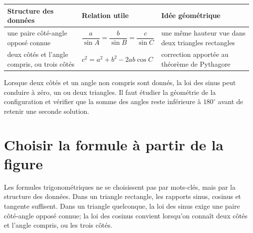 \documentclass[12pt,a4paper,openany]{book}
\begin{document}
\begin{center}
\begin{tabularx}{\textwidth}{@{}lYY@{}}
\toprule
Structure des données & Relation utile & Idée géométrique\\\midrule
une paire côté-angle opposé connue & $\dfrac a{\sin A}=\dfrac b{\sin B}=\dfrac c{\sin C}$ & une même hauteur vue dans deux triangles rectangles\\[0.7em]
deux côtés et l'angle compris, ou trois côtés & $c^2=a^2+b^2-2ab\cos C$ & correction apportée au théorème de Pythagore\\
\bottomrule
\end{tabularx}
\end{center}

\begin{center}
\end{center}

\begin{warningbox}
Lorsque deux côtés et un angle non compris sont donnés, la loi des sinus peut conduire à zéro, un ou deux triangles. Il faut étudier la géométrie de la configuration et vérifier que la somme des angles reste inférieure à $180^\circ$ avant de retenir une seconde solution.
\end{warningbox}

\section{Choisir la formule à partir de la figure}

\begin{visualbox}
Les formules trigonométriques ne se choisissent pas par mots-clés, mais par la structure des données. Dans un triangle rectangle, les rapports sinus, cosinus et tangente suffisent. Dans un triangle quelconque, la loi des sinus exige une paire côté-angle opposé connue; la loi des cosinus convient lorsqu'on connaît deux côtés et l'angle compris, ou les trois côtés.
\end{visualbox}
\end{document}
